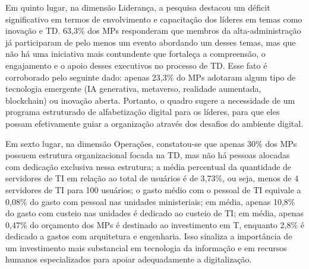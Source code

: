 Em quinto lugar, na dimensão Liderança, a pesquisa destacou um déficit significativo em termos de envolvimento e capacitação dos líderes em temas como inovação e TD. 63,3\% dos MPs responderam que membros da alta-administração já participaram de pelo menos um evento abordando um desses temas, mas que não há uma iniciativa mais contundente que fortaleça a compreensão, o engajamento e o apoio desses executivos no processo de TD. Esse fato é corroborado pelo seguinte dado: apenas 23,3\% do MPs adotaram algum tipo de tecnologia emergente (IA generativa, metaverso, realidade aumentada, blockchain) ou inovação aberta. Portanto, o quadro sugere a necessidade de um programa estruturado de alfabetização digital para os líderes, para que eles possam efetivamente guiar a organização através dos desafios do ambiente digital.

Em sexto lugar, na dimensão Operações, constatou-se que apenas 30\% dos MPs possuem estrutura organizacional focada na TD, mas não há pessoas alocadas com dedicação exclusiva nessa estrutura; a média percentual da quantidade de servidores de TI em relação ao total de usuários é de 3,73\%, ou seja, menos de 4 servidores de TI para 100 usuários; o gasto médio com o pessoal de TI equivale a 0,08\% do gasto com pessoal nas unidades ministeriais; em média, apenas 10,8\% do gasto com custeio nas unidades é dedicado ao custeio de TI; em média, apenas 0,47\% do orçamento dos MPs é destinado ao investimento em T, enquanto 2,8\% é dedicado a gastos com arquitetura e engenharia. Isso sinaliza a importância de um investimento mais substancial em tecnologia da informação e em recursos humanos especializados para apoiar adequadamente a digitalização.

